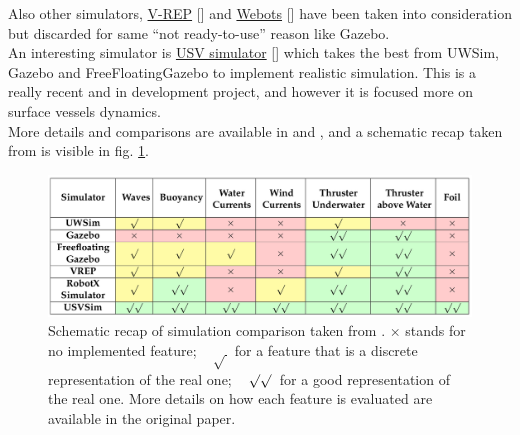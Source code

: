 Also other simulators, \href{http://www.coppeliarobotics.com/index.html}{V-REP} [\cite{vrep}] and \href{https://cyberbotics.com/}{Webots} [\cite{webots}] have been taken into consideration but discarded for same \enquote{not ready-to-use} reason like Gazebo.\\
An interesting simulator is \href{https://github.com/disaster-robotics-proalertas/usv_sim_lsa}{USV simulator} [\cite{usvsim}] which takes the best from UWSim, Gazebo and FreeFloatingGazebo to implement realistic simulation. This is a really recent and in development project, and however it is focused more on surface vessels dynamics.\\

More details and comparisons are available in \cite{simComparisonCook} and \cite{usvsim}, and a schematic recap taken from \cite{usvsim} is visible in fig. \ref{fig:simComparison}.
\begin{figure}[H]
	\centering
	\includegraphics[width=14cm]{simComparison.png}
	\caption[Schematic Simulators Comparison]{Schematic recap of simulation comparison taken from \cite{usvsim}. $\times$ stands for no implemented feature; ~ $\surd\,$  for a feature that is a discrete representation of the real one; ~ $\surd\surd\,$ for a good representation of the real one. More details on how each feature is evaluated are available in the original paper.}
	\label{fig:simComparison}
\end{figure}

